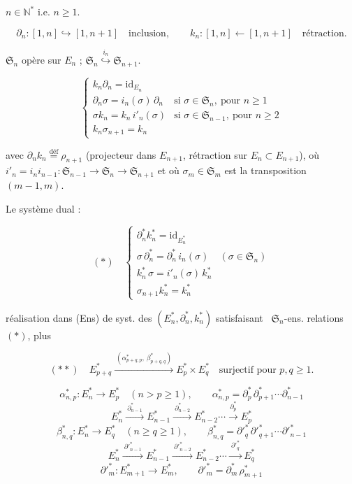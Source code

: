 \documentclass[11pt,a4paper]{article}
\begin{document}
$n \in \mathbb{N}^*$ i.e. $n \geq 1$.

\[
  \partial_n \colon [1,n] \hookrightarrow [1,n+1] \quad \text{inclusion}, \qquad
  k_n \colon [1,n] \longleftarrow [1,n+1] \quad \text{rétraction}.
\]

$\mathfrak{S}_n$ opère sur $E_n$ ; $\mathfrak{S}_n \overset{i_n}{\hookrightarrow} \mathfrak{S}_{n+1}$.

\[
  \begin{cases}
    k_n\partial_n = \mathrm{id}_{E_n} \\
    \partial_n\sigma = i_n(\sigma)\,\partial_n & \text{si } \sigma \in \mathfrak{S}_n,\ \text{pour } n \geq 1 \\
    \sigma k_n = k_n\,i'_n(\sigma) & \text{si } \sigma \in \mathfrak{S}_{n-1},\ \text{pour } n \geq 2 \\
    k_n\sigma_{n+1} = k_n &
  \end{cases}
\]

avec $\partial_nk_n \overset{\text{déf}}{=} \rho_{n+1}$ (projecteur dans
$E_{n+1}$, rétraction sur $E_n \subset E_{n+1}$), où
$i'_n = i_n i_{n-1} \colon \mathfrak{S}_{n-1} \to \mathfrak{S}_n \to
\mathfrak{S}_{n+1}$ et où $\sigma_m \in \mathfrak{S}_m$ est la transposition
$(m-1,m)$.

Le système dual :


\[
  (*) \quad
  \begin{cases}
    \partial^*_n k^*_n = \mathrm{id}_{E^*_n} \\
    \sigma\,\partial^*_n = \partial^*_n\,i_n(\sigma) & (\sigma \in \mathfrak{S}_n) \\
    k^*_n\,\sigma = i'_n(\sigma)\,k^*_n & \\
    \sigma_{n+1}k^*_n = k^*_n &
  \end{cases}
\]

réalisation dans (Ens) de syst. des $(E^*_n, \partial^*_n, k^*_n)$
satisfaisant \ill\ $\mathfrak{S}_n$-ens.  relations $(*)$, plus

\[
  (**) \quad
  E^*_{p+q} \xrightarrow{\ (\alpha^*_{p+q,p},\ \beta^*_{p+q,q})\ } E^*_p \times E^*_q
  \quad \text{surjectif pour } p, q \geq 1.
\]

\[
  \alpha^*_{n,p} \colon E^*_n \to E^*_p \quad (n > p \geq 1), \qquad
  \boxed{\alpha^*_{n,p} = \partial^*_p\,\partial^*_{p+1} \cdots \partial^*_{n-1}}
\]
\[
  E^*_n \xrightarrow{\ \partial^*_{n-1}\ } E^*_{n-1} \xrightarrow{\ \partial^*_{n-2}\ } E^*_{n-2} \cdots \xrightarrow{\ \partial^*_p\ } E^*_p
\]
\[
  \beta^*_{n,q} \colon E^*_n \to E^*_q \quad (n \geq q \geq 1), \qquad
  \boxed{\beta^*_{n,q} = \partial'^*_q\,\partial'^*_{q+1} \cdots \partial'^*_{n-1}}
\]
\[
  E^*_n \xrightarrow{\ \partial'^*_{n-1}\ } E^*_{n-1} \xrightarrow{\ \partial'^*_{n-2}\ } E^*_{n-2} \cdots \xrightarrow{\ \partial'^*_q\ } E^*_q
\]
\[
  \partial'^*_m \colon E^*_{m+1} \to E^*_m, \qquad \boxed{\partial'^*_m = \partial^*_m\,\rho^*_{m+1}}
\]
\end{document}
